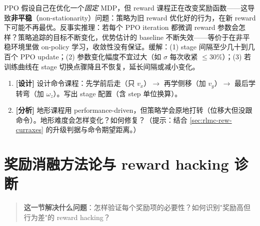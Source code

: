 \begin{insight}\label{ins:rlmc-rew-nonstationary}
PPO 假设自己在优化一个\emph{固定} MDP，但 reward 课程正在改变奖励函数——这导致\textbf{非平稳}（non-stationarity）问题：策略为旧 reward 优化好的行为，在新 reward 下可能不再最优。反事实推理：若每个 PPO iteration 都微调 reward 参数会怎样？策略追踪的目标不断变化，优势估计的 baseline 不断失效——等价于在非平稳环境里做 on-policy 学习，收敛性没有保证。缓解：(1) stage 间隔至少几十到几百个 PPO update；(2) 参数变化幅度不宜过大（如 $\sigma$ 每次收紧 $\le30\%$）；(3) 若训练曲线在 stage 切换点骤降且不恢复，延长间隔或减小变化。
\end{insight}


\begin{practice}[练习·课程]
\begin{enumerate}
  \item \textbf{[设计]} 设计命令课程：先学前后走（只 $v_x$）$\to$ 再学侧移（加 $v_y$）$\to$ 最后学转弯（加 $\omega_z$）。写出 stage 配置（含 step 单位换算）。
  \item \textbf{[分析]} 地形课程用 performance-driven，但策略学会原地打转（位移大但没跟命令）。地形难度会怎样变化？如何修复？（提示：结合 \cref{sec:rlmc-rew-curraxes} 的升级判据与命令期望距离。）
\end{enumerate}
\end{practice}

\section{奖励消融方法论与 reward hacking 诊断}
\label{sec:rlmc-rew-ablation}

\begin{quote}\small
\textbf{这一节解决什么问题}：怎样验证每个奖励项的必要性？如何识别"奖励高但行为差"的 reward hacking？
\end{quote}

